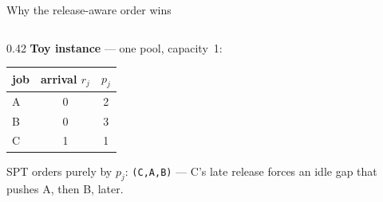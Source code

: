 \documentclass[aspectratio=169,t]{beamer}
\newcommand{\code}[1]{\texttt{#1}}
\begin{document}
\begin{frame}{Why the release-aware order wins}
  \begin{columns}[T,onlytextwidth]
    \begin{column}{0.42\textwidth}
      \small
      \textbf{Toy instance} --- one pool, capacity~1:
      \begin{center}
        \begin{tabular}{lcc}
          \toprule
          job & arrival $r_j$ & $p_j$ \\
          \midrule
          A & 0 & 2 \\
          B & 0 & 3 \\
          C & 1 & 1 \\
          \bottomrule
        \end{tabular}
      \end{center}
      \vspace{1mm}
      SPT orders purely by $p_j$: \code{(C,A,B)} --- C's late release forces an
      idle gap that pushes A, then B, later.
      \vspace{1mm}


\end{column}
\end{columns}
\end{frame}
\end{document}
